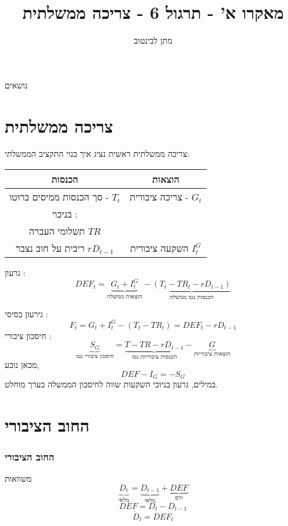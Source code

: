\documentclass[usenames,dvipsnames]{beamer}
\title[]{{מאקרו א' - תרגול 6 - צריכה ממשלתית}}
\author{\texthebrew{ מתן לבינטוב}}
\institute[{{ אב"ג}}]{{ אוניברסיטת בן גוריון בנגב}}
\begin{document}
\begin{RTL}
\begin{frame}
\titlepage
\end{frame}
\begin{frame}{נושאים}
    \tableofcontents
\end{frame}
\section{צריכה ממשלתית}
\begin{frame}[allowframebreaks]{צריכה ממשלתית}
    ראשית נציג איך בנוי התקציב הממשלתי:
    \begin{table}
    \centering
    \begin{tabular}{|c|c|} \hline 
         הכנסות& הוצאות\\ \hline 
         סך הכנסות ממיסים ברוטו  - $T_t$& צריכה ציבורית  - $G_t$\\ \hline 
         בניכוי : \\ תשלומי העברה $TR$ \\ ריבית על חוב נצבר $rD_{t-1}$&השקעה ציבורית $I_t^G$ \\ \hline
    \end{tabular}
    \end{table}
גרעון :
\begin{equation*}
    DEF_t = \underbrace{ G_t + I_t^G}_{\text{הוצאות ממשלה}} - \underbrace{(T_t -TR_t - rD_{t-1})}_{\text{הכנסות נטו ממשלה}}
\end{equation*}

גירעון בסיסי :
\begin{equation*}
    F_t = G_t + I_t^G - (T_t -TR_t) = DEF_t - rD_{t-1}
\end{equation*}
חיסכון ציבורי :
\begin{equation*}
   \underbrace{ S_G}_{\text{חיסכון ציבורי נטו}} = \underbrace{T - TR -rD_{t-1}}_{\text{הכנסות ציבוריות נטו}}-\underbrace{G}_{\text{הוצאות ציבוריות}}
\end{equation*}
מכאן נובע, 
\begin{equation*}
    DEF - I_G = -S_G
\end{equation*}
במילים, גרעון בניוכי השקעות שווה לחיסכון הממשלה בערך מוחלט.

\end{frame}
\section{החוב הציבורי}
\begin{frame}[allowframebreaks]
    \frametitle{החוב הציבורי}
    \begin{block}{משוואות}
        \begin{equation*}
            \underbrace{D_t}_{\text{מלאי}} = \underbrace{D_{t-1}}_{\text{מלאי}} + \underbrace{DEF}_{\text{זרם}}
        \end{equation*}
        \begin{equation*}
            DEF = D_t - D_{t-1}
        \end{equation*}
        \begin{equation*}
            \dot D_t = DEF_t
        \end{equation*}
    \end{block}


\end{frame}
\end{RTL}
\end{document}
